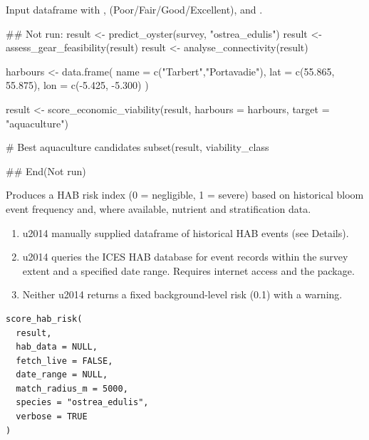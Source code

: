 \documentclass[a4paper]{book}
\begin{document}
%
\begin{Value}
Input dataframe with  ,
 (Poor/Fair/Good/Excellent), and .
\end{Value}
%
\begin{Examples}
\begin{ExampleCode}
## Not run: 
result <- predict_oyster(survey, "ostrea_edulis")
result <- assess_gear_feasibility(result)
result <- analyse_connectivity(result)

harbours <- data.frame(
  name = c("Tarbert","Portavadie"),
  lat  = c(55.865, 55.875),
  lon  = c(-5.425, -5.300)
)

result <- score_economic_viability(result, harbours = harbours,
                                    target = "aquaculture")

# Best aquaculture candidates
subset(result, viability_class %

## End(Not run)
\end{ExampleCode}
\end{Examples}
%
\begin{Description}
Produces a HAB risk index (0 = negligible, 1 = severe) based on historical
bloom event frequency and, where available, nutrient and stratification data.

\begin{enumerate}

\item{}  \bsl{}u2014 manually supplied dataframe of historical HAB events
(see Details).
\item{}  \bsl{}u2014 queries the ICES HAB database for event records
within the survey extent and a specified date range. Requires internet
access and the  package.
\item{} Neither \bsl{}u2014 returns a fixed background-level risk (0.1) with a warning.

\end{enumerate}

\end{Description}
%
\begin{Usage}
\begin{verbatim}
score_hab_risk(
  result,
  hab_data = NULL,
  fetch_live = FALSE,
  date_range = NULL,
  match_radius_m = 5000,
  species = "ostrea_edulis",
  verbose = TRUE
)
\end{verbatim}
\end{Usage}
\end{document}
